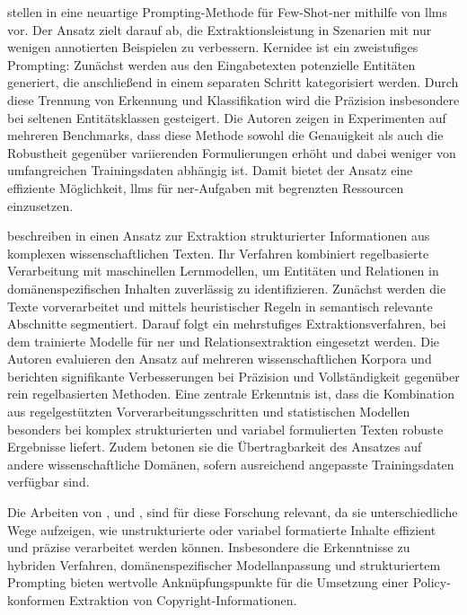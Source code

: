 \citeauthor{cheng_novel_2024} stellen in  eine neuartige Prompting-Methode für Few-Shot-\gls{ner} mithilfe von \glspl{llm} vor.
Der Ansatz zielt darauf ab, die Extraktionsleistung in Szenarien mit nur wenigen annotierten Beispielen zu verbessern.
Kernidee ist ein zweistufiges Prompting: Zunächst werden aus den Eingabetexten potenzielle Entitäten generiert, die anschließend in einem separaten Schritt kategorisiert werden.
Durch diese Trennung von Erkennung und Klassifikation wird die Präzision insbesondere bei seltenen Entitätsklassen gesteigert.
Die Autoren zeigen in Experimenten auf mehreren Benchmarks, dass diese Methode sowohl die Genauigkeit als auch die Robustheit gegenüber variierenden Formulierungen erhöht und dabei weniger von umfangreichen Trainingsdaten abhängig ist.
Damit bietet der Ansatz eine effiziente Möglichkeit, \glspl{llm} für \gls{ner}-Aufgaben mit begrenzten Ressourcen einzusetzen\autocite{cheng_novel_2024}.

\citeauthor{dunn_structured_2022} beschreiben in  einen Ansatz zur Extraktion strukturierter Informationen aus komplexen wissenschaftlichen Texten.
Ihr Verfahren kombiniert regelbasierte Verarbeitung mit maschinellen Lernmodellen, um Entitäten und Relationen in domänenspezifischen Inhalten zuverlässig zu identifizieren.
Zunächst werden die Texte vorverarbeitet und mittels heuristischer Regeln in semantisch relevante Abschnitte segmentiert.
Darauf folgt ein mehrstufiges Extraktionsverfahren, bei dem trainierte Modelle für \gls{ner} und Relationsextraktion eingesetzt werden.
Die Autoren evaluieren den Ansatz auf mehreren wissenschaftlichen Korpora und berichten signifikante Verbesserungen bei Präzision und Vollständigkeit gegenüber rein regelbasierten Methoden.
Eine zentrale Erkenntnis ist, dass die Kombination aus regelgestützten Vorverarbeitungsschritten und statistischen Modellen besonders bei komplex strukturierten und variabel formulierten Texten robuste Ergebnisse liefert.
Zudem betonen sie die Übertragbarkeit des Ansatzes auf andere wissenschaftliche Domänen, sofern ausreichend angepasste Trainingsdaten verfügbar sind\autocite{dunn_structured_2022}.

Die Arbeiten von \textcite{breton_empowering_2024}, \textcite{cheng_novel_2024} und \textcite{dunn_structured_2022}, sind für diese Forschung relevant, da sie unterschiedliche Wege aufzeigen, wie unstrukturierte oder variabel formatierte Inhalte effizient und präzise verarbeitet werden können.
Insbesondere die Erkenntnisse zu hybriden Verfahren, domänenspezifischer Modellanpassung und strukturiertem Prompting bieten wertvolle Anknüpfungspunkte für die Umsetzung einer Policy-konformen Extraktion von Copyright-Informationen.